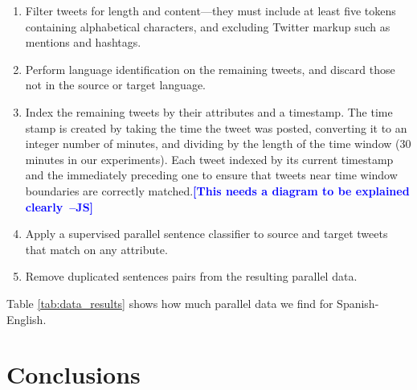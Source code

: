 \documentclass[11pt,letterpaper]{article}
\newcommand{\Note}[1]{\textbf{\large\textcolor{blue}{[#1]}}}
\newcommand{\NoteJS}[1]{\Note{#1~--JS}}
\begin{document}
\begin{enumerate}
\item Filter tweets for length and content---they must include at least five
tokens containing alphabetical characters, and excluding Twitter markup such as
mentions and hashtags.
\item Perform language identification on the remaining tweets, and discard those
not in the source or target language.
\item Index the remaining tweets by their attributes and a timestamp. The time
stamp is created by taking the time the tweet was posted, converting it to an
integer number of minutes, and dividing by the length of the time window (30
minutes in our experiments). Each tweet indexed by its current timestamp and the
immediately preceding one to ensure that tweets near time window boundaries are
correctly matched.\NoteJS{This needs a diagram to be explained clearly}
\item Apply a supervised parallel sentence classifier \cite{Smith10} to source and target tweets
that match on any attribute.
\item Remove duplicated sentences pairs from the resulting parallel data. 
\end{enumerate}

Table \ref{tab:data_results} shows how much parallel data we find
for Spanish-English.

\section{Conclusions}



\end{document}

